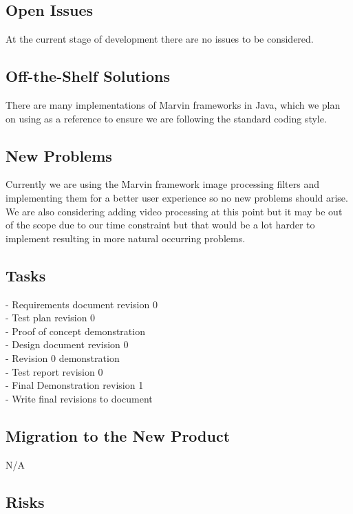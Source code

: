 \documentclass[12pt, titlepage]{article}
\begin{document}
\subsection{Open Issues}
At the current stage of development there are no issues to be considered.

\subsection{Off-the-Shelf Solutions}

There are many implementations of Marvin frameworks in Java, which we plan on using as a reference to ensure we are following the standard coding style.

\subsection{New Problems}

Currently we are using the Marvin framework image processing filters and implementing them for a better user experience so no new problems should arise. We are also considering adding video processing at this point but it may be out of the scope due to our time constraint but that would be a lot harder to implement resulting in more natural occurring problems.

\subsection{Tasks}


- Requirements document revision 0\\
- Test plan revision 0\\
- Proof of concept demonstration\\
- Design document revision 0\\
- Revision 0 demonstration\\
- Test report revision 0\\
- Final Demonstration revision 1\\  
- Write final revisions to document\\


\subsection{Migration to the New Product}

N/A

\subsection{Risks}
\end{document}
